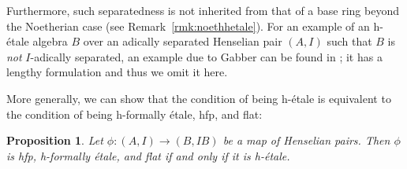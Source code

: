 \documentclass[12pt]{article}
\newcommand{\hfp}{hfp\xspace}
\newcommand{\hetale}{h-\'etale\xspace}
\newcommand{\hfetale}{h-formally \'etale\xspace}
\newtheorem{proposition}[theorem]{Proposition}
\theoremstyle{definition}
\numberwithin{equation}{subsection}
\begin{document}
Furthermore, such separatedness is not inherited from that of a base ring beyond the Noetherian case (see Remark~\ref{rmk:noethhetale}). For an example of an \hetale algebra $B$ over an adically separated Henselian pair $(A,I)$ such that $B$ is {\it not} $I$-adically separated, an example due to Gabber can be found in \cite[Example 5.2.13]{sheelathesis}; it has a lengthy formulation and thus we omit it here.

More generally, we can show that the condition of being \hetale is equivalent to the condition of being \hfetale, \hfp, and flat:

\begin{proposition}\label{prop:flathenset} Let $\phi: (A,I) \to (B,IB)$ be a map of Henselian pairs. Then $\phi$ is \hfp, \hfetale, and flat if and only if it is \hetale.
\end{proposition}
\end{document}
